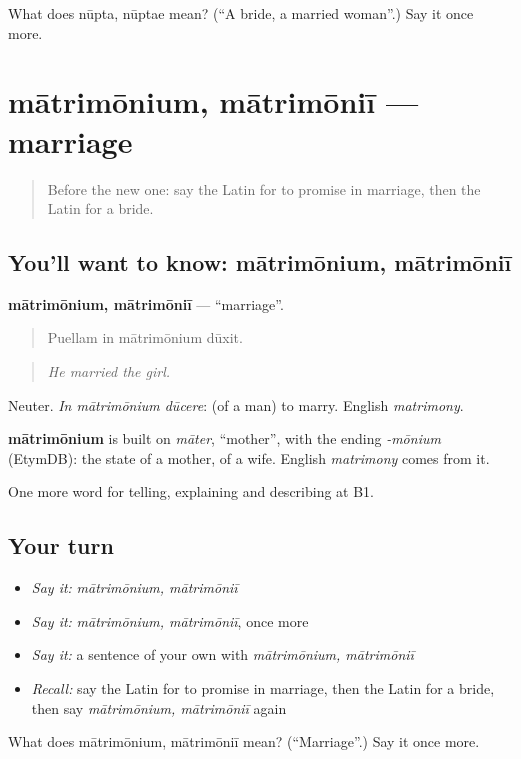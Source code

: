 \begin{tcolorbox}[breakable,colback=teal!4,colframe=teal!35!black,title={Before you move on}]
What does nūpta, nūptae mean? (\textquotedblleft{}A bride, a married woman\textquotedblright{}.) Say it once more.
\end{tcolorbox}
\section[mātrimōnium, mātrimōniī]{mātrimōnium, mātrimōniī — marriage}

\label{lesson:LA-C327-matrimonium}



\begin{quote}
Before the new one: say the Latin for to promise in marriage, then the Latin for a bride.
\end{quote}

\subsection*{You'll want to know: mātrimōnium, mātrimōniī}
\textbf{mātrimōnium, mātrimōniī} — \textquotedblleft{}marriage\textquotedblright{}.

\begin{quote}
Puellam in mātrimōnium dūxit.
\end{quote}

\begin{quote}
\emph{He married the girl.}
\end{quote}

Neuter. \emph{In mātrimōnium dūcere}: (of a man) to marry. English \emph{matrimony}.

\begin{cousinweb}
\textbf{mātrimōnium} is built on \emph{māter}, \textquotedblleft{}mother\textquotedblright{}, with the ending \emph{-mōnium} (EtymDB): the state of a mother, of a wife. English \emph{matrimony} comes from it.
\end{cousinweb}

\begin{grammarlens}[title={What you've built}]
One more word for telling, explaining and describing at B1.
\end{grammarlens}

\subsection*{Your turn}
\begin{itemize}
\raggedright
  \item \emph{Say it:} \emph{mātrimōnium, mātrimōniī}
  \item \emph{Say it:} \emph{mātrimōnium, mātrimōniī}, once more
  \item \emph{Say it:} a sentence of your own with \emph{mātrimōnium, mātrimōniī}
  \item \emph{Recall:} say the Latin for to promise in marriage, then the Latin for a bride, then say \emph{mātrimōnium, mātrimōniī} again
\end{itemize}

\begin{tcolorbox}[breakable,colback=teal!4,colframe=teal!35!black,title={Before you move on}]
What does mātrimōnium, mātrimōniī mean? (\textquotedblleft{}Marriage\textquotedblright{}.) Say it once more.
\end{tcolorbox}
